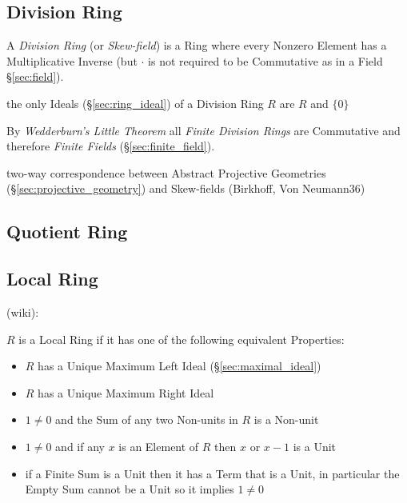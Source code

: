 \subsection{Division Ring}\label{sec:division_ring}

A \emph{Division Ring} (or \emph{Skew-field}) is a Ring where every Nonzero
Element has a Multiplicative Inverse (but $\cdot$ is not required to be
Commutative as in a Field \S\ref{sec:field}).

the only Ideals (\S\ref{sec:ring_ideal}) of a Division Ring $R$ are $R$ and
$\{0\}$

By \emph{Wedderburn's Little Theorem} all \emph{Finite Division Rings}
are Commutative and therefore \emph{Finite Fields}
(\S\ref{sec:finite_field}).

two-way correspondence between Abstract Projective Geometries
(\S\ref{sec:projective_geometry}) and Skew-fields (Birkhoff, Von Neumann36)



\subsection{Quotient Ring}\label{sec:quotient_ring}

\subsection{Local Ring}\label{sec:local_ring}

(wiki):

$R$ is a Local Ring if it has one of the following equivalent Properties:
\begin{itemize}
  \item $R$ has a Unique Maximum Left Ideal (\S\ref{sec:maximal_ideal})
  \item $R$ has a Unique Maximum Right Ideal
  \item $1 \neq 0$ and the Sum of any two Non-units in $R$ is a Non-unit
  \item $1 \neq 0$ and if any $x$ is an Element of $R$ then $x$ or $x - 1$ is a
    Unit
  \item if a Finite Sum is a Unit then it has a Term that is a Unit, in
    particular the Empty Sum cannot be a Unit so it implies $1 \neq 0$
\end{itemize}


